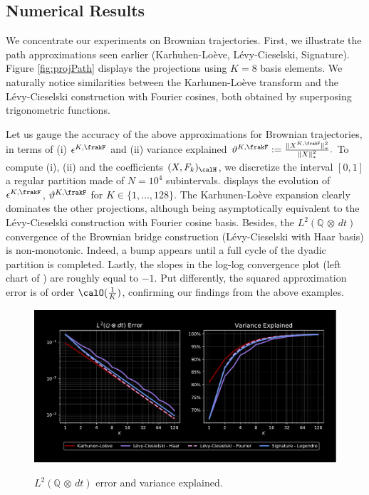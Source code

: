 \subsection{Numerical Results}\label{sec:numResultX}

We concentrate our experiments on Brownian trajectories.  
First, we illustrate %
the  path  approximations seen earlier (Karhuhen-Loève, L\'evy-Cieselski, Signature).
Figure \ref{fig:projPath} displays the projections using $K=8$ basis elements. We naturally notice similarities between the Karhunen-Loève transform and the L\'evy-Cieselski construction with Fourier cosines, both 
obtained by superposing trigonometric functions.

Let us gauge the accuracy of the above approximations for Brownian trajectories, in terms of (i) 
    $\epsilon^{K,\frakF}$ and (ii) variance explained 
    $ \vartheta^{K,\frakF} := \frac{\lVert X^{K,\frakF}  \rVert^2_{*}}{\left \lVert X \right \rVert^2_{*}}.$ 
To compute (i), (ii) and the coefficients $(X,F_k)_{\calH}$, we discretize the interval $[0,1]$ a regular partition made of $N = 10^4$ subintervals. 
 displays the evolution of $\epsilon^{K,\frakF}$, $\vartheta^{K,\frakF}$ for $K\in \{1,\ldots,128\}$. The Karhunen-Lo\`eve expansion clearly dominates the other projections, although being asymptotically equivalent to the L\'evy-Cieselski construction with Fourier cosine basis. Besides, the $L^2(\mathbb{Q} \, \otimes \, dt)$ convergence of the Brownian bridge construction (L\'evy-Cieselski with Haar basis) is non-monotonic. Indeed, a bump appears until a full cycle of the dyadic partition is completed. 
Lastly, the slopes in the log-log convergence plot  (left chart of ) 
are roughly equal to $-1$. Put differently,  the squared approximation error is of order $\calO(\frac{1}{K})$, confirming our findings from the  above examples.

\begin{figure}[t]
    \centering
    \caption{$L^2(\mathbb{Q} \, \otimes \, dt)$ error and variance explained.}
    \vspace{-2mm}
    \includegraphics[scale = 0.45]{KL/Figures/Err_VarExp.pdf}
    \label{fig:Error_VarExp}
\end{figure}